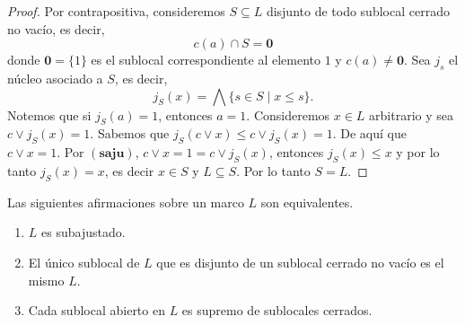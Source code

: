 \begin{proof}
    Por contrapositiva, consideremos $S\subseteq L$ disjunto de todo sublocal cerrado no vacío, es decir, 
    \[c(a)\cap S=\mathbf{0}\]
    donde $\mathbf{0}=\{1\}$ es el sublocal correspondiente al elemento $1$ y $c(a)\neq \mathbf{0}$. Sea $j_s$ el núcleo asociado a $S$, es decir,
    \[
    j_S(x)=\bigwedge\{s\in S\mid x\leq s\}.
    \]
    Notemos que si $j_S(a)=1$, entonces $a=1$. Consideremos $x\in L$ arbitrario y sea $c\vee j_S(x)=1$. Sabemos que $j_S(c\vee x)\leq c\vee j_S(x)=1$. De aquí que $c\vee x=1$. Por $(\mathbf{saju})$, $c\vee x=1=c\vee j_S(x)$, entonces $j_S(x)\leq x$ y por lo tanto $j_S(x)=x$, es decir $x\in S$ y $L\subseteq S$. Por lo tanto $S=L$. 
\end{proof}

\begin{thm}\label{Saju2orden}
    Las siguientes afirmaciones sobre un marco $L$ son equivalentes.
    \begin{enumerate}[$i)$]
        \item $L$ es subajustado.
        \item El único sublocal de $L$ que es disjunto de un sublocal cerrado no vacío es el mismo $L$.
        \item Cada sublocal abierto en $L$ es supremo de sublocales cerrados.
    \end{enumerate}
\end{thm}

